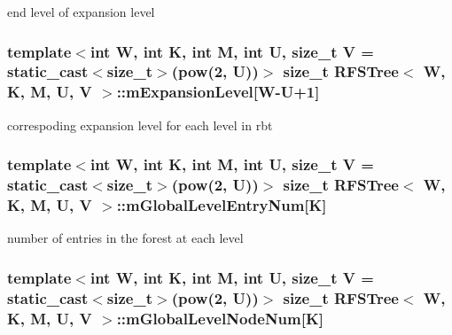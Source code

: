 end level of expansion level 

\hypertarget{classRFSTree_ac0537ae45e791bf13064ecff318ef051}{
\subsubsection[{m\-Expansion\-Level}]{\setlength{\rightskip}{0pt plus 5cm}template$<$int W, int K, int M, int U, size\-\_\-t V = static\-\_\-cast$<$size\-\_\-t$>$(pow(2, U))$>$ size\-\_\-t {\bf R\-F\-S\-Tree}$<$ {\bf W}, K, M, U, V $>$\-::m\-Expansion\-Level\mbox{[}{\bf W}-\/U+1\mbox{]}\hspace{0.3cm}{\ttfamily [private]}}}\label{classRFSTree_ac0537ae45e791bf13064ecff318ef051}


correspoding expansion level for each level in rbt 

\hypertarget{classRFSTree_a22b8577ea6d16ce5008e5969c757b976}{
\subsubsection[{m\-Global\-Level\-Entry\-Num}]{\setlength{\rightskip}{0pt plus 5cm}template$<$int W, int K, int M, int U, size\-\_\-t V = static\-\_\-cast$<$size\-\_\-t$>$(pow(2, U))$>$ size\-\_\-t {\bf R\-F\-S\-Tree}$<$ {\bf W}, K, M, U, V $>$\-::m\-Global\-Level\-Entry\-Num\mbox{[}K\mbox{]}\hspace{0.3cm}{\ttfamily [private]}}}\label{classRFSTree_a22b8577ea6d16ce5008e5969c757b976}


number of entries in the forest at each level 

\hypertarget{classRFSTree_a1fb5db4a8ec4c8ab5e89606609054619}{
\subsubsection[{m\-Global\-Level\-Node\-Num}]{\setlength{\rightskip}{0pt plus 5cm}template$<$int W, int K, int M, int U, size\-\_\-t V = static\-\_\-cast$<$size\-\_\-t$>$(pow(2, U))$>$ size\-\_\-t {\bf R\-F\-S\-Tree}$<$ {\bf W}, K, M, U, V $>$\-::m\-Global\-Level\-Node\-Num\mbox{[}K\mbox{]}\hspace{0.3cm}{\ttfamily [private]}}}\label{classRFSTree_a1fb5db4a8ec4c8ab5e89606609054619}


